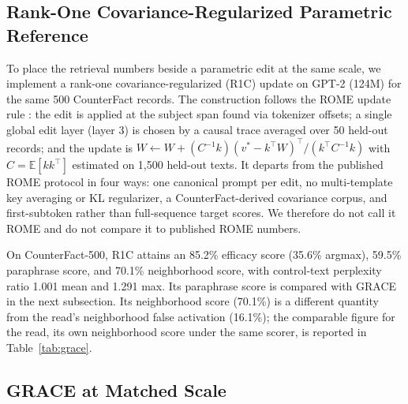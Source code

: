 \documentclass[preprint,12pt]{elsarticle}
\newif\ifmarkchanges
\newcommand{\rev}[1]{\ifmarkchanges{\color{blue}#1}\else#1\fi}
\begin{document}
\subsection{Rank-One Covariance-Regularized Parametric Reference}
\label{sec:counterfact_rome}

To place the retrieval numbers beside a parametric edit at the same scale, we implement a rank-one covariance-regularized (R1C) update on GPT-2 (124M) for the same 500 CounterFact records. The construction follows the ROME update rule \cite{meng2022locating}: the edit is applied at the subject span found via tokenizer offsets; a single global edit layer (layer 3) is chosen by a causal trace averaged over 50 held-out records; and the update is $W \leftarrow W + (C^{-1}k)(v^*-k^{\top}W)^{\top}/(k^{\top}C^{-1}k)$ with $C=\mathbb{E}[kk^{\top}]$ estimated on 1,500 held-out texts. It departs from the published ROME protocol in four ways: one canonical prompt per edit, no multi-template key averaging or KL regularizer, a CounterFact-derived covariance corpus, and first-subtoken rather than full-sequence target scores. We therefore do not call it ROME and do not compare it to published ROME numbers.

On CounterFact-500, R1C attains an 85.2\% efficacy score (35.6\% argmax), 59.5\% paraphrase score, and 70.1\% neighborhood score, with control-text perplexity ratio 1.001 mean and 1.291 max. Its paraphrase score is compared with GRACE in the next subsection. \rev{Its neighborhood score (70.1\%) is a different quantity from the read's neighborhood false activation (16.1\%); the comparable figure for the read, its own neighborhood score under the same scorer, is reported in Table~\ref{tab:grace}.}

\subsection{GRACE at Matched Scale}
\label{sec:grace}
\end{document}

